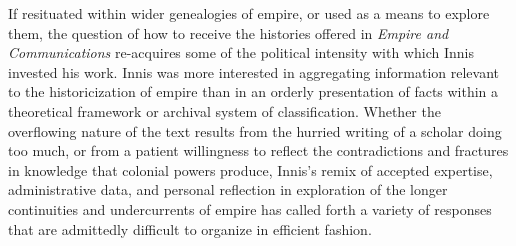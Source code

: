 \documentclass{tufte-handout}
\begin{document}
If resituated within wider genealogies of empire, or used as a means to
explore them, the question of how to receive the histories offered in
\emph{Empire and Communications} re-acquires some of the political
intensity with which Innis invested his work. Innis was more interested
in aggregating information relevant to the historicization of empire
than in an orderly presentation of facts within a theoretical framework
or archival system of classification. Whether the overflowing nature of
the text results from the hurried writing of a scholar doing too much,
or from a patient willingness to reflect the contradictions and
fractures in knowledge that colonial powers produce, Innis's remix of
accepted expertise, administrative data, and personal reflection in
exploration of the longer continuities and undercurrents of empire has
called forth a variety of responses that are admittedly difficult to
organize in efficient fashion.
\end{document}
